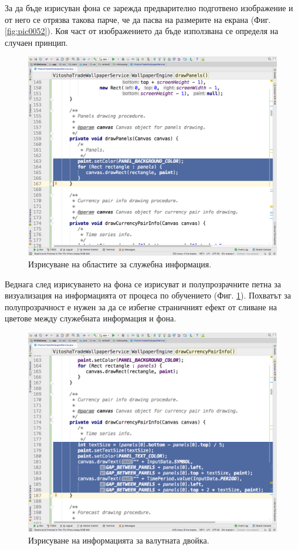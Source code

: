 \documentclass[book,14pt,oneside,openany]{memoir}
\begin{document}
За да бъде изрисуван фона се зарежда предварително подготвено изображение и от него се отрязва такова парче, че да пасва на размерите на екрана (Фиг. \ref{fig:pic0052}). Коя част от изображението да бъде използвана се определя на случаен принцип.

\begin{figure}[h]
  \centering
  \includegraphics[height=0.45\pdfpageheight]{pic0053}
  \caption{Изрисуване на областите за служебна информация.}
\label{fig:pic0053}
\end{figure}
\FloatBarrier

Веднага след изрисуването на фона се изрисуват и полупрозрачните петна за визуализация на информацията от процеса по обучението (Фиг. \ref{fig:pic0053}). Похватът за полупрозрачност е нужен за да се избегне страничният ефект от сливане на цветове между служебната информация и фона. 

\begin{figure}[h]
  \centering
  \includegraphics[height=0.45\pdfpageheight]{pic0054}
  \caption{Изрисуване на информацията за валутната двойка.}
\label{fig:pic0054}
\end{figure}
\FloatBarrier
\end{document}
